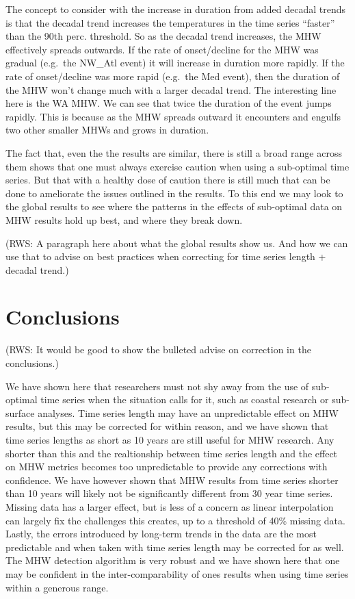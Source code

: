 \documentclass[]{article}
\begin{document}
The concept to consider with the increase in duration from added decadal
trends is that the decadal trend increases the temperatures in the time
series ``faster'' than the 90th perc. threshold. So as the decadal trend
increases, the MHW effectively spreads outwards. If the rate of
onset/decline for the MHW was gradual (e.g.~the NW\_Atl event) it will
increase in duration more rapidly. If the rate of onset/decline was more
rapid (e.g.~the Med event), then the duration of the MHW won't change
much with a larger decadal trend. The interesting line here is the WA
MHW. We can see that twice the duration of the event jumps rapidly. This
is because as the MHW spreads outward it encounters and engulfs two
other smaller MHWs and grows in duration.

The fact that, even the the results are similar, there is still a broad
range across them shows that one must always exercise caution when using
a sub-optimal time series. But that with a healthy dose of caution there
is still much that can be done to ameliorate the issues outlined in the
results. To this end we may look to the global results to see where the
patterns in the effects of sub-optimal data on MHW results hold up best,
and where they break down.

(RWS: A paragraph here about what the global results show us. And how we
can use that to advise on best practices when correcting for time series
length + decadal trend.)

\hypertarget{conclusions}{%
\section{Conclusions}\label{conclusions}}

(RWS: It would be good to show the bulleted advise on correction in the
conclusions.)

We have shown here that researchers must not shy away from the use of
sub-optimal time series when the situation calls for it, such as coastal
research or sub-surface analyses. Time series length may have an
unpredictable effect on MHW results, but this may be corrected for
within reason, and we have shown that time series lengths as short as 10
years are still useful for MHW research. Any shorter than this and the
realtionship between time series length and the effect on MHW metrics
becomes too unpredictable to provide any corrections with confidence. We
have however shown that MHW results from time series shorter than 10
years will likely not be significantly different from 30 year time
series. Missing data has a larger effect, but is less of a concern as
linear interpolation can largely fix the challenges this creates, up to
a threshold of 40\% missing data. Lastly, the errors introduced by
long-term trends in the data are the most predictable and when taken
with time series length may be corrected for as well. The MHW detection
algorithm is very robust and we have shown here that one may be
confident in the inter-comparability of ones results when using time
series within a generous range.
\end{document}
